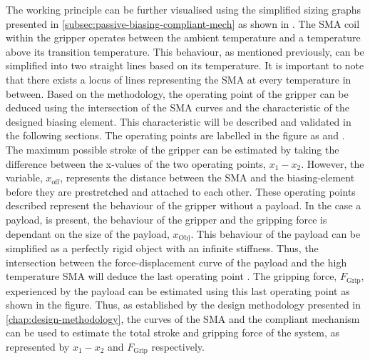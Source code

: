 The working principle can be further visualised using the simplified sizing graphs presented in \cref{subsec:passive-biasing-compliant-mech} as shown in \todocite. The SMA coil within the gripper operates between the ambient temperature and a temperature above its transition temperature. This behaviour, as mentioned previously, can be simplified into two straight lines based on its temperature. It is important to note that there exists a locus of lines representing the SMA at every temperature in between. Based on the methodology, the operating point of the gripper can be deduced using the intersection of the SMA curves and the characteristic of the designed biasing element. This characteristic will be described and validated in the following sections. The operating points are labelled in the figure as  and . The maximum possible stroke of the gripper can be estimated by taking the difference between the x-values of the two operating points, $x_1-x_2$. However, the variable, $x_\mathrm{off}$, represents the distance between the SMA and the biasing-element before they are prestretched and attached to each other. These operating points described represent the behaviour of the gripper without a payload. In the case a payload, is present, the behaviour of the gripper and the gripping force is dependant on the size of the payload, $x_\mathrm{Obj}$. This behaviour of the payload can be simplified as a perfectly rigid object with an infinite stiffness. Thus, the intersection between the force-displacement curve of the payload and the high temperature SMA will deduce the last operating point . The gripping force, $F_\mathrm{Grip}$, experienced by the payload can be estimated using this last operating point as shown in the figure. Thus, as established by the design methodology presented in \cref{chap:design-methodology}, the curves of the SMA and the compliant mechanism can be used to estimate the total stroke and gripping force of the system, as represented by $x_1-x_2$ and $F_\mathrm{Grip}$ respectively.

